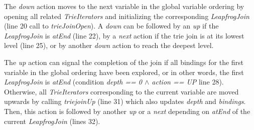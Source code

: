 The \textit{down} action moves to the next variable in the global variable ordering by opening all related \textit{TrieIterators}
and initializing the corresponding \textit{LeapfrogJoin} (line 20 call to \textit{trieJoinOpen}). %
A \textit{down} can be followed by an \textit{up} if the \textit{LeapfrogJoin} is \textit{atEnd} (line 22),
by a \textit{next} action if the trie join is at its lowest level (line 25), or by another \textit{down} action to reach the deepest level.

The \textit{up} action can signal the completion of the join if all bindings for the first variable in the global ordering have
been explored, or in other words, the first \textit{LeapfrogJoin} is \textit{atEnd} (condition
\textit{depth == 0 $\wedge$ action ==  UP} line 28). %
Otherwise, all \textit{TrieIterators} corresponding to the current variable are moved upwards by calling \textit{triejoinUp} (line 31)
which also updates \textit{depth} and \textit{bindings}.  %
Then, this action is followed by another \textit{up} or a \textit{next} depending on \textit{atEnd} of the current \textit{LeapfrogJoin}
(lines 32). %


